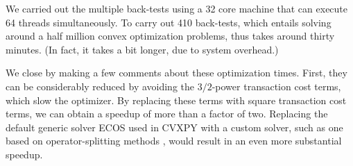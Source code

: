 \documentclass[openany]{now}
\begin{document}
We carried out the multiple back-tests using a 32 core machine that can execute
64 threads simultaneously.
To carry out 410 back-tests, which entails solving around a half million convex
optimization problems, thus takes around thirty minutes. (In fact, it takes a bit
longer, due to system overhead.)

We close by making a few comments about these optimization times.  First, they can
be considerably reduced by avoiding the $3/2$-power transaction cost terms, which
slow the optimizer.  By replacing these terms with square transaction cost terms,
we can obtain a speedup of more than a factor of two.
Replacing the default generic solver ECOS \cite{domahidi2013ecos} used in CVXPY
with a custom solver, such as one based on
operator-splitting methods \cite{boyd2011distributed},
would result in an even more substantial speedup.

\backmatter


\end{document}
